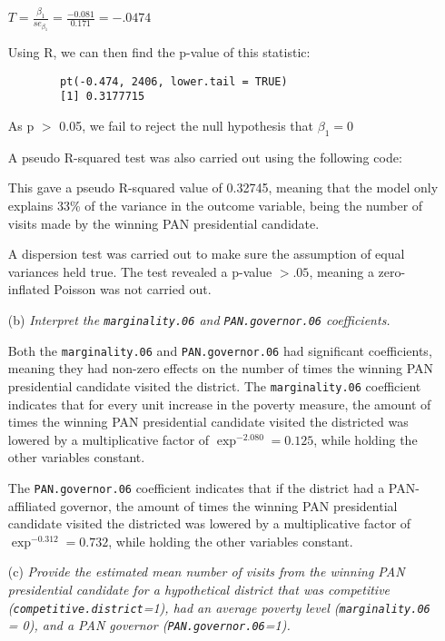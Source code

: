 \documentclass[12pt,letterpaper]{article}
\begin{document}
\begin{enumerate}
	\begin{center}
		$T = \frac{\beta_{1}}{se_{\beta_{1}}} = \frac{-0.081}{0.171} = -.0474$
	\end{center}
	
	\noindent Using R, we can then find the p-value of this statistic:
	\begin{Verbatim}
		pt(-0.474, 2406, lower.tail = TRUE)
		[1] 0.3177715
	\end{Verbatim}

	\noindent As p $>$ 0.05, we fail to reject the null hypothesis that $\beta_{1} = 0$
	
	\noindent A pseudo R-squared test was also carried out using the following code:
	
	
	\noindent This gave a pseudo R-squared value of 0.32745, meaning that the model only explains 33\% of the variance in the outcome variable, being the number of visits made by the winning PAN presidential candidate.
	
	\noindent A dispersion test was carried out to make sure the assumption of equal variances held true. The test revealed a p-value $> .05$, meaning a zero-inflated Poisson was not carried out.
	
	\item [(b)]
	\textit{Interpret the \texttt{marginality.06} and \texttt{PAN.governor.06} coefficients.}
	
	\noindent Both the \texttt{marginality.06} and \texttt{PAN.governor.06} had significant coefficients, meaning they had non-zero effects on the number of times the winning PAN presidential candidate visited the district. The \texttt{marginality.06} coefficient indicates that for every unit increase in the poverty measure, the amount of times the winning PAN presidential candidate visited the districted was lowered by a multiplicative factor of $\exp^{-2.080} = 0.125$, while holding the other variables constant.
	
	\noindent The \texttt{PAN.governor.06} coefficient indicates that if the district had a PAN-affiliated governor, the amount of times the winning PAN presidential candidate visited the districted was lowered by a multiplicative factor of $\exp^{-0.312} = 0.732$, while holding the other variables constant.
	\item [(c)]
	\textit{Provide the estimated mean number of visits from the winning PAN presidential candidate for a hypothetical district that was competitive (\texttt{competitive.district}=1), had an average poverty level (\texttt{marginality.06} = 0), and a PAN governor (\texttt{PAN.governor.06}=1).}
	

\end{enumerate}
\end{document}
